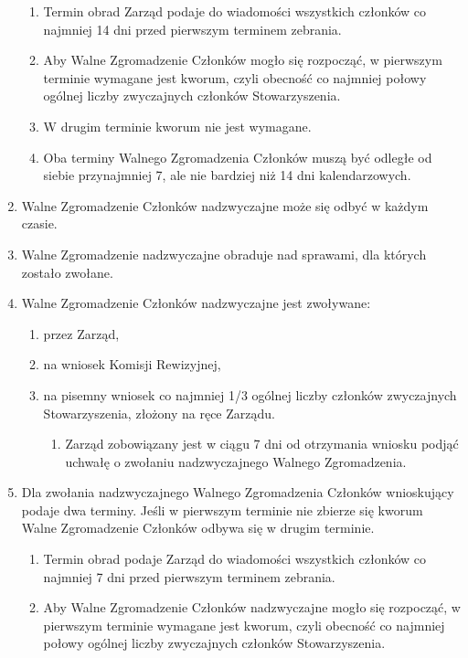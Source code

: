 \documentclass{article}
\begin{document}
\begin{enumerate}
\begin{enumerate}
        \item Termin obrad Zarząd podaje do wiadomości wszystkich członków co najmniej 14 dni przed pierwszym terminem zebrania.
        \item Aby Walne Zgromadzenie Członków mogło się rozpocząć, w pierwszym terminie wymagane jest kworum, czyli obecność co najmniej połowy ogólnej liczby zwyczajnych członków Stowarzyszenia.
        \item W drugim terminie kworum nie jest wymagane.
        \item Oba terminy Walnego Zgromadzenia Członków muszą być odległe od siebie przynajmniej 7, ale nie bardziej niż 14 dni kalendarzowych.
      \end{enumerate}
    \item Walne Zgromadzenie Członków nadzwyczajne może się odbyć w każdym czasie.
    \item Walne Zgromadzenie nadzwyczajne obraduje nad sprawami, dla których zostało zwołane.
    \item Walne Zgromadzenie Członków nadzwyczajne jest zwoływane:
      \begin{enumerate}
        \item przez Zarząd,
        \item na wniosek Komisji Rewizyjnej,
        \item na pisemny wniosek co najmniej 1/3 ogólnej liczby członków zwyczajnych Stowarzyszenia, złożony na ręce Zarządu.
          \begin{enumerate}
            \item Zarząd zobowiązany jest w ciągu 7 dni od otrzymania wniosku podjąć uchwałę o zwołaniu nadzwyczajnego Walnego Zgromadzenia.
          \end{enumerate}
        \end{enumerate}
    \item Dla zwołania nadzwyczajnego Walnego Zgromadzenia Członków wnioskujący podaje dwa terminy. Jeśli w pierwszym terminie nie zbierze się kworum Walne Zgromadzenie Członków odbywa się w drugim terminie.
      \begin{enumerate}
        \item Termin obrad podaje Zarząd do wiadomości wszystkich członków co najmniej 7 dni przed pierwszym terminem zebrania.
        \item Aby Walne Zgromadzenie Członków nadzwyczajne mogło się rozpocząć, w pierwszym terminie wymagane jest kworum, czyli obecność co najmniej połowy ogólnej liczby zwyczajnych członków Stowarzyszenia.

\end{enumerate}
\end{enumerate}
\end{document}
